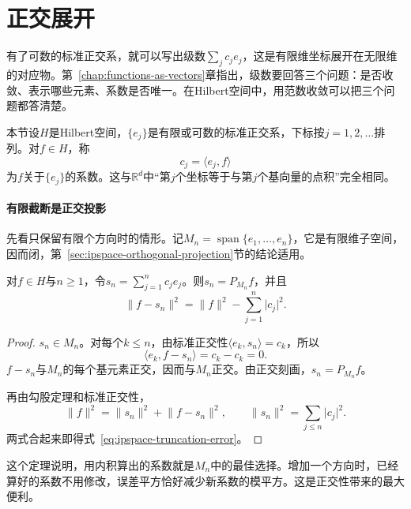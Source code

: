 \section{正交展开}
\label{sec:ipspace-orthogonal-expansions}

有了可数的标准正交系，就可以写出级数$\sum_jc_je_j$，这是有限维坐标展开在无限维的对应物。第~\ref{chap:functions-as-vectors}章指出，级数要回答三个问题：是否收敛、表示哪些元素、系数是否唯一。在Hilbert空间中，用范数收敛可以把三个问题都答清楚。

本节设$H$是Hilbert空间，$\{e_j\}$是有限或可数的标准正交系，下标按$j=1,2,\ldots$排列。对$f\in H$，称
\begin{equation}
 c_j=\langle e_j,f\rangle
 \label{eq:ipspace-coefficients}
\end{equation}
为$f$关于$\{e_j\}$的系数。这与$\mathbb R^d$中“第$j$个坐标等于与第$j$个基向量的点积”完全相同。

\paragraph{有限截断是正交投影}
先看只保留有限个方向时的情形。记$M_n=\operatorname{span}\{e_1,\ldots,e_n\}$，它是有限维子空间，因而闭，第~\ref{sec:ipspace-orthogonal-projection}节的结论适用。

\begin{theorem}[有限截断]
\label{thm:ipspace-finite-truncation}
对$f\in H$与$n\geq1$，令$s_n=\sum_{j=1}^nc_je_j$。则$s_n=P_{M_n}f$，并且
\begin{equation}
 \lVert f-s_n\rVert^2=\lVert f\rVert^2-\sum_{j=1}^n\lvert c_j\rvert^2 .
 \label{eq:ipspace-truncation-error}
\end{equation}
\end{theorem}

\begin{proof}
$s_n\in M_n$。对每个$k\leq n$，由标准正交性$\langle e_k,s_n\rangle=c_k$，所以
\[
 \langle e_k,f-s_n\rangle=c_k-c_k=0 .
\]
$f-s_n$与$M_n$的每个基元素正交，因而与$M_n$正交。由正交刻画，$s_n=P_{M_n}f$。

再由勾股定理和标准正交性，
\[
 \lVert f\rVert^2=\lVert s_n\rVert^2+\lVert f-s_n\rVert^2,\qquad \lVert s_n\rVert^2=\sum_{j\leq n}\lvert c_j\rvert^2 .
\]
两式合起来即得式~\eqref{eq:ipspace-truncation-error}。
\end{proof}

这个定理说明，用内积算出的系数就是$M_n$中的最佳选择。增加一个方向时，已经算好的系数不用修改，误差平方恰好减少新系数的模平方。这是正交性带来的最大便利。

